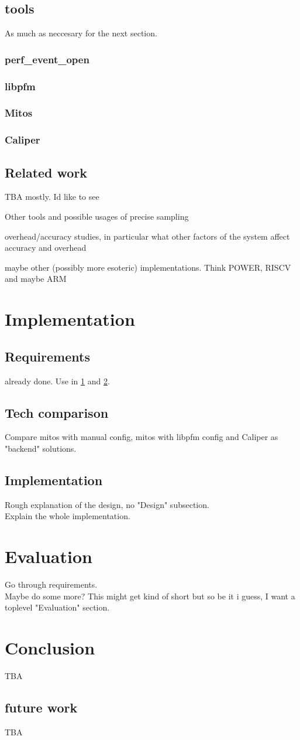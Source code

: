 \documentclass[11pt, a4paper]{article}
\begin{document}
\subsection{tools}
As much as neccesary for the next section.
\subsubsection{perf\_event\_open}
\subsubsection{libpfm}
\subsubsection{Mitos}\label{subsub:mitos}
\subsubsection{Caliper}
\subsection{Related work}
TBA mostly. Id like to see
\begin{enumerate*}
    \item Other tools and possible usages of precise sampling
    \item overhead/accuracy studies, in particular what other factors of the system affect accuracy and overhead
    \item maybe other (possibly more esoteric) implementations. Think POWER, RISCV and maybe ARM
\end{enumerate*}

\section{Implementation}\label{sec:impl}
\subsection{Requirements}
already done. Use in \ref{sec:impl} and \ref{sec:eval}.
\subsection{Tech comparison}
Compare mitos with manual config, mitos with libpfm config and Caliper as "backend" solutions.
\subsection{Implementation}
Rough explanation of the design, no "Design" subsection. \\
Explain the whole implementation.

\section{Evaluation}\label{sec:eval}
Go through requirements. \\
Maybe do some more? This might get kind of short but so be it i guess, I want a toplevel "Evaluation" section.

\section{Conclusion}
TBA
\subsection{future work}
TBA
\end{document}
